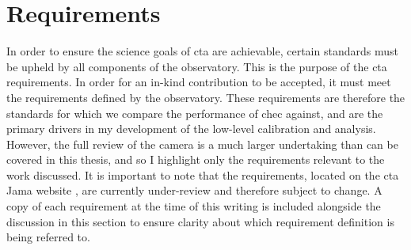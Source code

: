 \section{Requirements}

In order to ensure the science goals of \gls{cta} are achievable, certain standards must be upheld by all components of the observatory. This is the purpose of the \gls{cta} requirements. In order for an in-kind contribution to be accepted, it must meet the requirements defined by the observatory. These requirements are therefore the standards for which we compare the performance of \gls{chec} against, and are the primary drivers in my development of the low-level calibration and analysis. However, the full review of the camera is a much larger undertaking than can be covered in this thesis, and so I highlight only the requirements relevant to the work discussed.
It is important to note that the requirements, located on the \gls{cta} Jama website \cite{cta-jama}, are currently under-review and therefore subject to change. A copy of each requirement at the time of this writing is included alongside the discussion in this section to ensure clarity about which requirement definition is being referred to.

